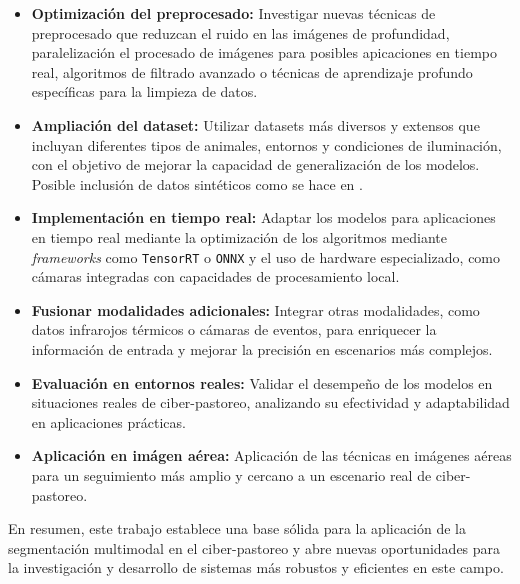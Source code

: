 \documentclass[12pt,a4paper]{report}
\begin{document}
\begin{itemize}
    \item \textbf{Optimización del preprocesado:} Investigar nuevas técnicas de preprocesado que reduzcan el ruido en las imágenes de profundidad, paralelización el procesado de imágenes para posibles apicaciones en tiempo real, algoritmos de filtrado avanzado o técnicas de aprendizaje profundo específicas para la limpieza de datos.

    \item \textbf{Ampliación del dataset:} Utilizar datasets más diversos y extensos que incluyan diferentes tipos de animales, entornos y condiciones de iluminación, con el objetivo de mejorar la capacidad de generalización de los modelos. Posible inclusión de datos sintéticos como se hace en \cite{haucke2021exploitingdepthinformationwildlife}.

    \item \textbf{Implementación en tiempo real:} Adaptar los modelos para aplicaciones en tiempo real mediante la optimización de los algoritmos mediante \textit{frameworks} como \texttt{TensorRT} o \texttt{ONNX} y el uso de hardware especializado, como cámaras integradas con capacidades de procesamiento local.

    \item \textbf{Fusionar modalidades adicionales:} Integrar otras modalidades, como datos infrarojos térmicos o cámaras de eventos, para enriquecer la información de entrada y mejorar la precisión en escenarios más complejos.

    \item \textbf{Evaluación en entornos reales:} Validar el desempeño de los modelos en situaciones reales de ciber-pastoreo, analizando su efectividad y adaptabilidad en aplicaciones prácticas.
    
    \item \textbf{Aplicación en imágen aérea:} Aplicación de las técnicas en imágenes aéreas para un seguimiento más amplio y cercano a un escenario real de ciber-pastoreo.
\end{itemize}

En resumen, este trabajo establece una base sólida para la aplicación de la segmentación multimodal en el ciber-pastoreo y abre nuevas oportunidades para la investigación y desarrollo de sistemas más robustos y eficientes en este campo.


\appendix
\label{app:appendix_a}



\end{document}
